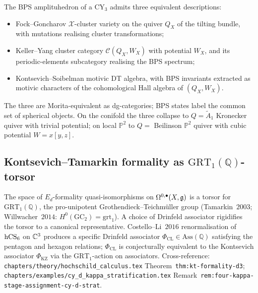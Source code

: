 \begin{theorem}[FZ = Keller--Yang = KS]\ClaimStatusTheorem
\label{wn:thm:plat-bps-amplituhedron}
The BPS amplituhedron of a CY$_3$ admits three equivalent descriptions:
\begin{itemize}
\item Fock--Goncharov $\mathcal{X}$-cluster variety on the quiver
$Q_X$ of the tilting bundle, with mutations realising cluster
transformations;
\item Keller--Yang cluster category $\mathcal{C}(Q_X, W_X)$ with
potential $W_X$, and its periodic-elements subcategory realising
the BPS spectrum;
\item Kontsevich--Soibelman motivic DT algebra, with BPS
invariants extracted as motivic characters of the cohomological Hall
algebra of $(Q_X, W_X)$.
\end{itemize}
The three are Morita-equivalent as dg-categories; BPS states label the
common set of spherical objects. On the conifold the three collapse to
$Q = \widetilde{A}_1$ Kronecker quiver with trivial potential; on local
$\mathbb{P}^2$ to $Q = $ Beilinson $\mathbb{P}^2$ quiver with cubic
potential $W = x[y,z]$.
\end{theorem}

\subsection{Kontsevich--Tamarkin formality as $\mathrm{GRT}_1(\mathbb{Q})$-torsor}
\label{wn:subsec:plat-kt-formality-grt}

\begin{theorem}\ClaimStatusTheorem
\label{wn:thm:plat-kt-grt-torsor}
The space of $E_d$-formality quasi-isomorphisms on $\Omega^{0,\bullet}(X,
\mathfrak{g})$ is a torsor for $\mathrm{GRT}_1(\mathbb{Q})$, the
pro-unipotent Grothendieck--Teichm\"uller group (Tamarkin~$2003$;
Willwacher~$2014$: $H^0(\mathrm{GC}_2) = \mathrm{grt}_1$). A choice of
Drinfeld associator rigidifies the torsor to a canonical representative.
Costello--Li~$2016$ renormalisation of $\mathrm{hCS}_6$ on $\mathbb{C}^3$ produces a
specific Drinfeld associator $\Phi_{\mathrm{CL}} \in \mathrm{Ass}(\mathbb{Q})$
satisfying the pentagon and hexagon relations; $\Phi_{\mathrm{CL}}$ is
conjecturally equivalent to the Kontsevich associator
$\Phi_{\mathrm{KZ}}$ via the $\mathrm{GRT}_1$-action on associators.
Cross-reference:
\texttt{chapters/theory/hochschild\_calculus.tex}
Theorem~\texttt{thm:kt-formality-d3};
\texttt{chapters/examples/cy\_d\_kappa\_stratification.tex}
Remark~\texttt{rem:four-kappa-stage-assignment-cy-d-strat}.
\end{theorem}

